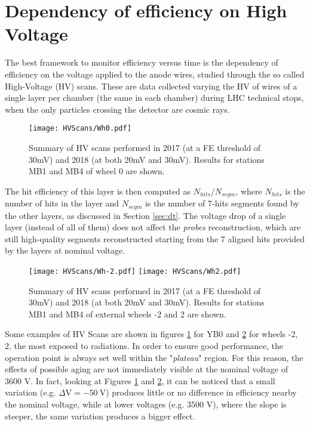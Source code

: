 \documentclass[12pt,twoside,a4paper]{report}
\numberwithin{equation}{section}
\begin{document}
\section{Dependency of efficiency on High Voltage}
\label{sec:HV_I}
The best framework to monitor efficiency versus time is the dependency of efficiency on the voltage applied to the anode wires, studied through the so called High-Voltage (HV) scans. These are data collected varying the HV of wires of a single layer per chamber (the same in each chamber) during LHC technical stops, when the only particles crossing the detector are cosmic rays.
\begin{figure}[!htb]
\texttt{[image: HVScans/Wh0.pdf]}
\caption{\label{fig:HVScans_Wh0} Summary of HV scans performed in 2017 (at a FE threshold of 30mV) and 2018 (at both 20mV and 30mV). Results for stations MB1 and MB4 of wheel 0 are shown.}
\end{figure}
The hit efficiency of this layer is then computed as $N_{hits}/N_{segm}$, where $N_{hits}$ is the number of hits in the layer and $N_{segm}$ is the number of 7-hits segments found by the other layers, as discussed in Section \ref{sec:dt}.
The voltage drop of a single layer (instead of all of them) does not affect the \textit{probes} reconstruction, which are still high-quality segments reconstructed starting from the 7 aligned hits provided by the layers at nominal voltage.

\begin{figure}[!htb]
\begin{center}
\texttt{[image: HVScans/Wh-2.pdf]}
\texttt{[image: HVScans/Wh2.pdf]}
\caption{\label{fig:HVScans_Wh-2_2} Summary of HV scans performed in 2017 (at a FE threshold of 30mV) and 2018 (at both 20mV and 30mV). Results for stations MB1 and MB4 of external wheels -2 and 2 are shown.}
\end{center}
\end{figure}
Some examples of HV Scans are shown in figures \ref{fig:HVScans_Wh0} for YB0 and \ref{fig:HVScans_Wh-2_2} for wheels -2, 2, the most exposed to radiations.
In order to ensure good performance, the operation point is always set well within the "\textit{plateau}" region.
For this reason, the effects of possible aging are not immediately visible at the nominal voltage of 3600 V. In fact, looking at Figures \ref{fig:HVScans_Wh0} and \ref{fig:HVScans_Wh-2_2}, it can be noticed that a small variation (e.g. $\Delta \mathrm{V} = -50\ \mathrm{V}$) produces little or no difference in efficiency nearby the nominal voltage, while at lower voltages (e.g. 3500 V), where the slope is steeper, the same variation produces a bigger effect.
\end{document}
